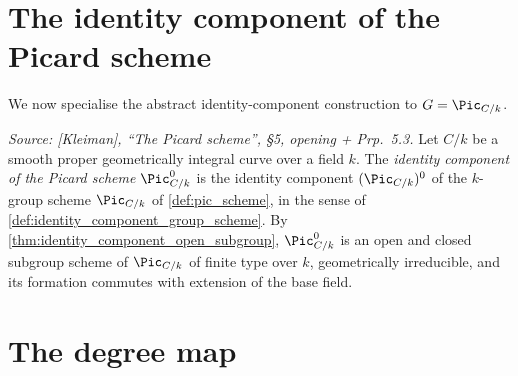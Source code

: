 \section{The identity component of the Picard scheme}
\label{sec:pic0_definition}

We now specialise the abstract identity-component construction to
\(G = \Pic_{C/k}\).

\begin{definition}

  \label{def:pic_zero_subscheme}
  
  \textit{Source: [Kleiman], ``The Picard scheme'', \S 5, opening +
  Prp.~5.3.}
  Let \(C/k\) be a smooth proper geometrically integral curve over a field
  \(k\). The \emph{identity component of the Picard scheme}
  \(\Pic^0_{C/k}\) is the identity component
  \((\Pic_{C/k})^0\) of the \(k\)-group scheme \(\Pic_{C/k}\) of
  \cref{def:pic_scheme}, in the sense of
  \cref{def:identity_component_group_scheme}. By
  \cref{thm:identity_component_open_subgroup}, \(\Pic^0_{C/k}\) is an open
  and closed subgroup scheme of \(\Pic_{C/k}\) of finite type over \(k\),
  geometrically irreducible, and its formation commutes with
  extension of the base field.
\end{definition}

\section{The degree map}
\label{sec:pic_degree}

